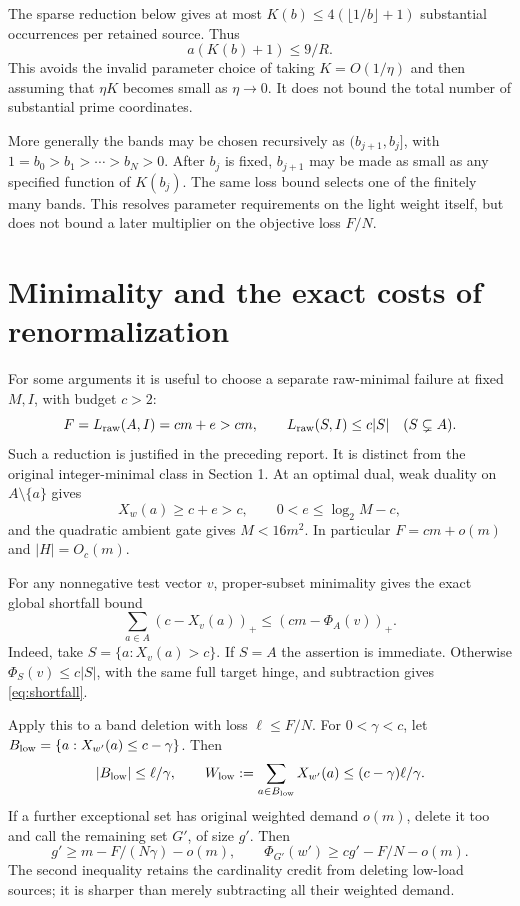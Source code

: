 \documentclass[11pt,a4paper]{article}
\theoremstyle{remark}\newtheorem{remark}[theorem]{Remark}
\newcommand{\pos}[1]{(#1)_+}
\newcommand{\LP}{L_{\rm raw}}
\begin{document}
The sparse reduction below gives at most
\(K(b)\le4(\lfloor1/b\rfloor+1)\) substantial occurrences per retained
source. Thus
\begin{equation}
 a(K(b)+1)\le9/R.\label{eq:gapsmall}
\end{equation}
This avoids the invalid parameter choice of taking \(K=O(1/\eta)\)
and then assuming that \(\eta K\) becomes small as \(\eta\to0\).
It does not bound the total number of substantial prime coordinates.

More generally the bands may be chosen recursively as
\((b_{j+1},b_j]\), with \(1=b_0>b_1>\cdots>b_N>0\).
After \(b_j\) is fixed, \(b_{j+1}\) may be made as small as any
specified function of \(K(b_j)\). The same loss bound selects one
of the finitely many bands. This resolves parameter requirements on
the light weight itself, but does not bound a later multiplier on
the objective loss \(F/N\).

\section{Minimality and the exact costs of renormalization}

For some arguments it is useful to choose a separate raw-minimal
failure at fixed \(M,I\), with budget \(c>2\):
\[
 F=\LP(A,I)=cm+e>cm,\qquad
 \LP(S,I)\le c|S|\quad(S\subsetneq A).
\]
Such a reduction is justified in the preceding report. It is distinct
from the original integer-minimal class in Section 1.
At an optimal dual, weak duality on \(A\setminus\{a\}\) gives
\[
 X_w(a)\ge c+e>c,\qquad
 0<e\le\log_2M-c,
\]
and the quadratic ambient gate gives \(M<16m^2\). In particular
\(F=cm+o(m)\) and \(|H|=O_c(m)\).

For any nonnegative test vector \(v\), proper-subset minimality gives
the exact global shortfall bound
\begin{equation}
 \sum_{a\in A}\pos{c-X_v(a)}\le\pos{cm-\Phi_A(v)}.
 \label{eq:shortfall}
\end{equation}
Indeed, take \(S=\{a:X_v(a)>c\}\). If \(S=A\) the assertion is
immediate. Otherwise \(\Phi_S(v)\le c|S|\), with the same full target
hinge, and subtraction gives \eqref{eq:shortfall}.

Apply this to a band deletion with loss \(\ell\le F/N\). For
\(0<\gamma<c\), let
\(B_{\rm low}=\{a:X_{w'}(a)\le c-\gamma\}\). Then
\begin{equation}
 |B_{\rm low}|\le\ell/\gamma,\qquad
 W_{\rm low}:=\sum_{a\in B_{\rm low}}X_{w'}(a)
 \le(c-\gamma)\ell/\gamma.\label{eq:lowdiscard}
\end{equation}
If a further exceptional set has original weighted demand \(o(m)\),
delete it too and call the remaining set \(G'\), of size \(g'\). Then
\begin{equation}
 g'\ge m-F/(N\gamma)-o(m),\qquad
 \Phi_{G'}(w')\ge cg'-F/N-o(m).\label{eq:aftergap}
\end{equation}
The second inequality retains the cardinality credit from deleting
low-load sources; it is sharper than merely subtracting all their
weighted demand.
\end{document}

